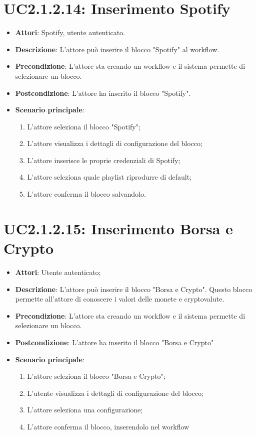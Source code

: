 \section{UC2.1.2.14: Inserimento Spotify}
\label{UC2.1.2.14}
\begin{itemize}
	\item \textbf{Attori}: Spotify, utente autenticato.
	\item \textbf{Descrizione}: L'attore può inserire il blocco "Spotify" al workflow.
	\item \textbf{Precondizione}: L'attore sta creando un workflow e il sistema permette di selezionare un blocco.
	\item \textbf{Postcondizione}: L'attore ha inserito il blocco "Spotify".
	\item \textbf{Scenario principale}:
	\begin{enumerate} \item L'attore seleziona il blocco "Spotify"; \item L'attore visualizza i dettagli di configurazione del blocco; \item  L'attore inserisce le proprie credenziali di Spotify;  \item  L'attore seleziona quale playlist riprodurre di default; \item L'attore conferma il blocco salvandolo.\end{enumerate}
\end{itemize}

\section{UC2.1.2.15: Inserimento Borsa e Crypto}
\label{UC2.1.2.15}
\begin{itemize}
	\item \textbf{Attori}: Utente autenticato;
	\item \textbf{Descrizione}: L'attore può inserire il blocco "Borsa e Crypto". Questo blocco permette all'attore di conoscere i valori delle monete e cryptovalute. 
	\item \textbf{Precondizione}: L'attore sta creando un workflow e il sistema permette di selezionare un blocco.
	\item \textbf{Postcondizione}: L'attore ha inserito il blocco "Borsa e Crypto"
	\item \textbf{Scenario principale}:
	\begin{enumerate} \item L'attore seleziona il blocco "Borsa e Crypto"; \item L'utente visualizza i dettagli di configurazione del blocco;  \item  L'attore seleziona una configurazione; \item L'attore conferma il blocco, inserendolo nel workflow \end{enumerate}
\end{itemize}

